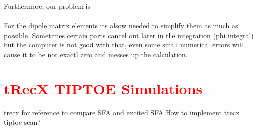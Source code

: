 Furthermore, our problem is \\\\

For the dipole matrix elements its alsow needed to simplify them as much as possible. 
Sometimes certain parts cancel out later in the integration (phi integral) but the computer is not good with that, even some small numerical errors will cause it to be not exactl zero and messes up the calculation.




\section{\textcolor{red}{tRecX TIPTOE Simulations}}
trecx for reference to compare SFA and excited SFA
How to implement trecx tiptoe scan?

